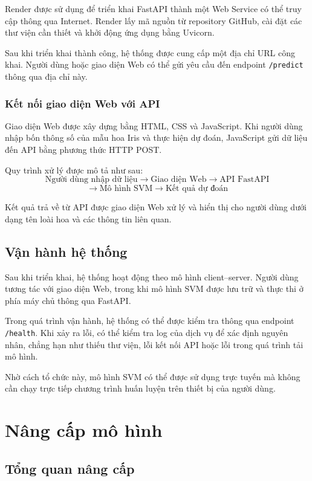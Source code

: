 \documentclass[12pt,a4paper]{report}
\begin{document}
	Render được sử dụng để triển khai FastAPI thành một Web Service có thể truy cập thông qua Internet. Render lấy mã nguồn từ repository GitHub, cài đặt các thư viện cần thiết và khởi động ứng dụng bằng Uvicorn.
	
	Sau khi triển khai thành công, hệ thống được cung cấp một địa chỉ URL công khai. Người dùng hoặc giao diện Web có thể gửi yêu cầu đến endpoint \texttt{/predict} thông qua địa chỉ này.
	
	\subsection{Kết nối giao diện Web với API}
	
	Giao diện Web được xây dựng bằng HTML, CSS và JavaScript. Khi người dùng nhập bốn thông số của mẫu hoa Iris và thực hiện dự đoán, JavaScript gửi dữ liệu đến API bằng phương thức HTTP POST.
	
	\noindent
	Quy trình xử lý được mô tả như sau:
	$$
	\text{Người dùng nhập dữ liệu}
	\rightarrow
	\text{Giao diện Web}
	\rightarrow
	\text{API FastAPI}
	$$
	$$
	\rightarrow
	\text{Mô hình SVM}
	\rightarrow
	\text{Kết quả dự đoán}
	$$
	
	Kết quả trả về từ API được giao diện Web xử lý và hiển thị cho người dùng dưới dạng tên loài hoa và các thông tin liên quan.
	
	\section{Vận hành hệ thống}
	
	Sau khi triển khai, hệ thống hoạt động theo mô hình client--server. Người dùng tương tác với giao diện Web, trong khi mô hình SVM được lưu trữ và thực thi ở phía máy chủ thông qua FastAPI.
	
	Trong quá trình vận hành, hệ thống có thể được kiểm tra thông qua endpoint \texttt{/health}. Khi xảy ra lỗi, có thể kiểm tra log của dịch vụ để xác định nguyên nhân, chẳng hạn như thiếu thư viện, lỗi kết nối API hoặc lỗi trong quá trình tải mô hình.
	
	Nhờ cách tổ chức này, mô hình SVM có thể được sử dụng trực tuyến mà không cần chạy trực tiếp chương trình huấn luyện trên thiết bị của người dùng.
	
	\chapter{Nâng cấp mô hình}
	
	\section{Tổng quan nâng cấp}
\end{document}
